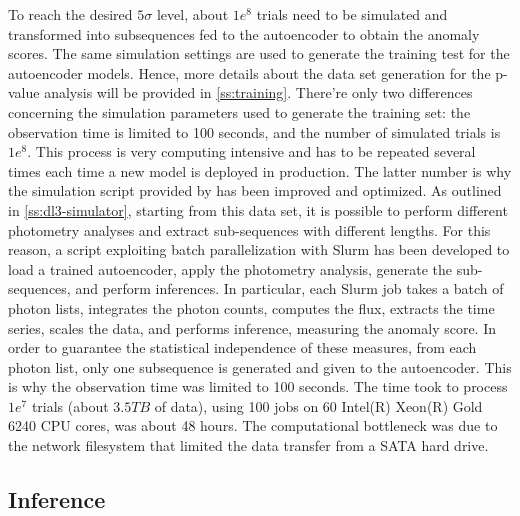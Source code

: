 To reach the desired $5\sigma$ level, about $1e^8$ trials need to be simulated and transformed into subsequences fed to the autoencoder to obtain the anomaly scores. The same simulation settings are used to generate the training test for the autoencoder models. Hence, more details about the data set generation for the p-value analysis will be provided in \autoref{ss:training}. There're only two differences concerning the simulation parameters used to generate the training set: the observation time is limited to 100 seconds, and the number of simulated trials is $1e^8$. This process is very computing intensive and has to be repeated several times each time a new model is deployed in production. The latter number is why the simulation script provided by \cite{dipiano2022ctasagsci} has been improved and optimized. As outlined in \autoref{ss:dl3-simulator}, starting from this data set, it is possible to perform different photometry analyses and extract sub-sequences with different lengths. For this reason, a script exploiting batch parallelization with Slurm has been developed to load a trained autoencoder, apply the photometry analysis, generate the sub-sequences, and perform inferences. In particular, each Slurm job takes a batch of photon lists, integrates the photon counts, computes the flux, extracts the time series, scales the data, and performs inference, measuring the anomaly score. In order to guarantee the statistical independence of these measures, from each photon list, only one subsequence is generated and given to the autoencoder. This is why the observation time was limited to 100 seconds. The time took to process $1e^7$ trials (about $3.5 TB$ of data), using 100 jobs on 60 Intel(R) Xeon(R) Gold 6240 CPU  cores, was about 48 hours. The computational bottleneck was due to the network filesystem that limited the data transfer from a SATA hard drive. 



\subsection{Inference}
\label{ss:inference}


